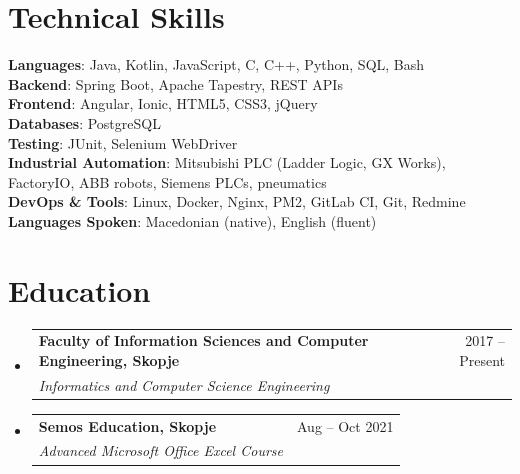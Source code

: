 \documentclass[letterpaper,11pt]{article}
\makeatletter
\newcommand{\resumeSubheading}[4]{
  \vspace{-2pt}\item
    \begin{tabular*}{0.97\textwidth}[t]{l@{\extracolsep{\fill}}r}
      \textbf{#1} & #2 \\
      \textit{\small#3} & \textit{\small #4} \\
    \end{tabular*}\vspace{-7pt}
}
\newcommand{\resumeSubHeadingListStart}{\begin{itemize}[leftmargin=0.15in, label={}]}
\newcommand{\resumeSubHeadingListEnd}{\end{itemize}}
\makeatother
\begin{document}
\section{Technical Skills}
 \begin{itemize}[leftmargin=0.15in, label={}]
    \small{\item{
     \textbf{Languages}{: Java, Kotlin, JavaScript, C, C++, Python, SQL, Bash} \\
     \textbf{Backend}{: Spring Boot, Apache Tapestry, REST APIs} \\
     \textbf{Frontend}{: Angular, Ionic, HTML5, CSS3, jQuery} \\
     \textbf{Databases}{: PostgreSQL} \\
     \textbf{Testing}{: JUnit, Selenium WebDriver} \\
     \textbf{Industrial Automation}{: Mitsubishi PLC (Ladder Logic, GX Works), FactoryIO, ABB robots, Siemens PLCs, pneumatics} \\
     \textbf{DevOps \& Tools}{: Linux, Docker, Nginx, PM2, GitLab CI, Git, Redmine} \\
     \textbf{Languages Spoken}{: Macedonian (native), English (fluent)} \\
    }}
 \end{itemize}

\section{Education}
  \resumeSubHeadingListStart
    \resumeSubheading
      {Faculty of Information Sciences and Computer Engineering, Skopje}{2017 -- Present}
      {Informatics and Computer Science Engineering}{}
    \resumeSubheading
      {Semos Education, Skopje}{Aug -- Oct 2021}
      {Advanced Microsoft Office Excel Course}{}
  \resumeSubHeadingListEnd

\end{document}

